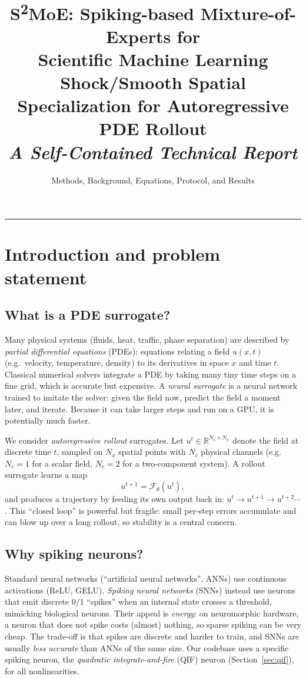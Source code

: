 \documentclass[11pt]{article}
\title{\textbf{S\textsuperscript{2}MoE: Spiking-based Mixture-of-Experts for\\
Scientific Machine Learning}\\[4pt]
\large Shock/Smooth Spatial Specialization for Autoregressive PDE Rollout\\[2pt]
\normalsize\textit{A Self-Contained Technical Report}}
\author{Methods, Background, Equations, Protocol, and Results}
\date{}
\begin{document}
\maketitle
\tableofcontents
\bigskip\hrule\bigskip

\section{Introduction and problem statement}\label{sec:intro}

\subsection{What is a PDE surrogate?}
Many physical systems (fluids, heat, traffic, phase separation) are described by \emph{partial
differential equations} (PDEs): equations relating a field $u(x,t)$ (e.g.\ velocity, temperature,
density) to its derivatives in space $x$ and time $t$. Classical numerical solvers integrate a PDE
by taking many tiny time steps on a fine grid, which is accurate but expensive. A \emph{neural
surrogate} is a neural network trained to imitate the solver: given the field now, predict the field
a moment later, and iterate. Because it can take larger steps and run on a GPU, it is potentially
much faster.

We consider \emph{autoregressive rollout} surrogates. Let $u^t \in \mathbb{R}^{N_c\times N_x}$ denote
the field at discrete time $t$, sampled on $N_x$ spatial points with $N_c$ physical channels (e.g.\
$N_c{=}1$ for a scalar field, $N_c{=}2$ for a two-component system). A rollout surrogate learns a map
\begin{equation}
u^{t+1} = \mathcal{F}_\theta(u^t),
\end{equation}
and produces a trajectory by feeding its own output back in: $u^{t}\!\to\!u^{t+1}\!\to\!u^{t+2}\cdots$.
This ``closed loop'' is powerful but fragile: small per-step errors accumulate and can blow up over a
long rollout, so stability is a central concern.

\subsection{Why spiking neurons?}
Standard neural networks (``artificial neural networks'', ANNs) use continuous activations (ReLU,
GELU). \emph{Spiking neural networks} (SNNs) instead use neurons that emit discrete $0/1$ ``spikes''
when an internal state crosses a threshold, mimicking biological neurons. Their appeal is
\emph{energy}: on neuromorphic hardware, a neuron that does not spike costs (almost) nothing, so
sparse spiking can be very cheap. The trade-off is that spikes are discrete and harder to train, and
SNNs are usually \emph{less accurate} than ANNs of the same size. Our codebase uses a specific
spiking neuron, the \emph{quadratic integrate-and-fire} (QIF) neuron (Section~\ref{sec:qif}), for all
nonlinearities.
\end{document}
